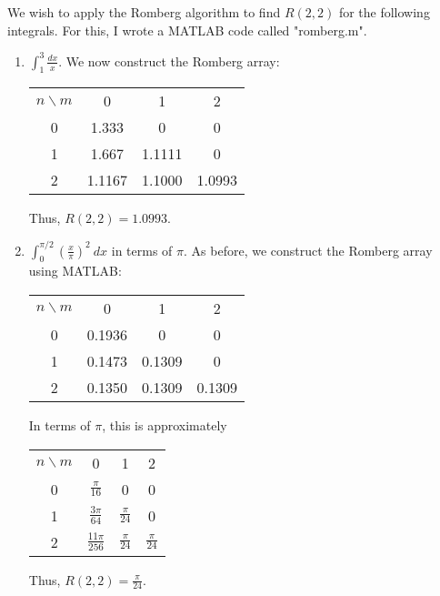 \documentclass{article}
\begin{document}
We wish to apply the Romberg algorithm to find $R(2,2)$ for the following integrals. For this, I wrote a MATLAB code called "romberg.m". 
\begin{enumerate}
\item $\displaystyle\int_1^3 \frac{dx}{x}$. We now construct the Romberg array:

\begin{center}
\begin{tabular}{cccc}
	$n \backslash m$ & 0 & 1 & 2\\
	0 & 1.333 & 0 & 0\\
	1 & 1.667 & 1.1111 & 0\\
	2 & 1.1167 & 1.1000 & 1.0993
\end{tabular}
\end{center}
Thus, $R(2,2) = 1.0993$.

\item $\displaystyle\int_0^{\pi/2} (\frac{x}{\pi})^2\ dx$ in terms of $\pi$. As before, we construct the Romberg array using MATLAB:

\begin{center}
\begin{tabular}{cccc}
	$n \backslash m$ & 0 & 1 & 2\\
	0 & 0.1936 & 0 & 0\\
	1 & 0.1473 & 0.1309 & 0\\
	2 & 0.1350 & 0.1309 & 0.1309
\end{tabular}
\end{center}

In terms of $\pi$, this is approximately 

\begin{center}
\begin{tabular}{cccc}
	$n \backslash m$ & 0 & 1 & 2\\
	0 & $\frac{\pi}{16}$ & 0 & 0\\
	1 & $\frac{3\pi}{64}$ & $\frac{\pi}{24}$ & 0\\
	2 & $\frac{11\pi}{256}$ & $\frac{\pi}{24}$ & $\frac{\pi}{24}$
\end{tabular}
\end{center}

Thus, $R(2,2) = \frac{\pi}{24}$. 

\end{enumerate}
\end{document}
